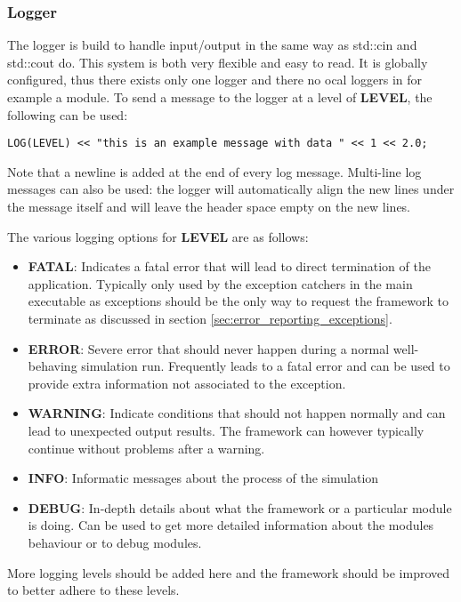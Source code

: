 \subsubsection{Logger}
\label{sec:logger}
The logger is build to handle input/output in the same way as std::cin and std::cout do. This system is both very flexible and easy to read. It is globally configured, thus there exists only one logger and there no ocal loggers in for example a module. To send a message to the logger at a level of \textbf{LEVEL}, the following can be used:
\begin{verbatim}
LOG(LEVEL) << "this is an example message with data " << 1 << 2.0;
\end{verbatim}
Note that a newline is added at the end of every log message. Multi-line log messages can also be used: the logger will automatically align the new lines under the message itself and will leave the header space empty on the new lines.

The various logging options for \textbf{LEVEL} are as follows:
\begin{itemize}
\item \textbf{FATAL}: Indicates a fatal error that will lead to direct termination of the application. Typically only used by the exception catchers in the main executable as exceptions should be the only way to request the framework to terminate as discussed in section \ref{sec:error_reporting_exceptions}.
\item \textbf{ERROR}: Severe error that should never happen during a normal well-behaving simulation run. Frequently leads to a fatal error and can be used to provide extra information not associated to the exception.
\item \textbf{WARNING}: Indicate conditions that should not happen normally and can lead to unexpected output results. The framework can however typically continue without problems after a warning.
\item \textbf{INFO}: Informatic messages about the process of the simulation
\item \textbf{DEBUG}: In-depth details about what the framework or a particular module is doing. Can be used to get more detailed information about the modules behaviour or to debug modules.
\end{itemize}
\todo More logging levels should be added here and the framework should be improved to better adhere to these levels. \todo


